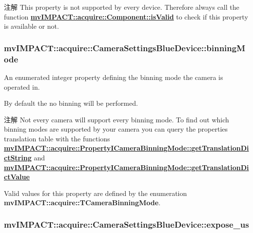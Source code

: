 \begin{DoxyNote}{注解}
This property is not supported by every device. Therefore always call the function {\bfseries \hyperlink{classmv_i_m_p_a_c_t_1_1acquire_1_1_component_ac51e55e7e046101f3c6119d84123abd5}{mv\+I\+M\+P\+A\+C\+T\+::acquire\+::\+Component\+::is\+Valid}} to check if this property is available or not. 
\end{DoxyNote}
\hypertarget{classmv_i_m_p_a_c_t_1_1acquire_1_1_camera_settings_blue_device_a6dc3cb5b21c3b9b6ebba4039a601b982}{
\subsubsection[{binning\+Mode}]{ mv\+I\+M\+P\+A\+C\+T\+::acquire\+::\+Camera\+Settings\+Blue\+Device\+::binning\+Mode}}\label{classmv_i_m_p_a_c_t_1_1acquire_1_1_camera_settings_blue_device_a6dc3cb5b21c3b9b6ebba4039a601b982}


An enumerated integer property defining the binning mode the camera is operated in. 

By default the no binning will be performed. \begin{DoxyNote}{注解}
Not every camera will support every binning mode. To find out which binning modes are supported by your camera you can query the properties translation table with the functions {\bfseries \hyperlink{classmv_i_m_p_a_c_t_1_1acquire_1_1_enum_property_i_af5ec5a9c3657af2917f4ead78ef067db}{mv\+I\+M\+P\+A\+C\+T\+::acquire\+::\+Property\+I\+Camera\+Binning\+Mode\+::get\+Translation\+Dict\+String}} and {\bfseries \hyperlink{classmv_i_m_p_a_c_t_1_1acquire_1_1_enum_property_i_a0c50700ebff2806621c63d03b624f200}{mv\+I\+M\+P\+A\+C\+T\+::acquire\+::\+Property\+I\+Camera\+Binning\+Mode\+::get\+Translation\+Dict\+Value}} 
\end{DoxyNote}
Valid values for this property are defined by the enumeration {\bfseries mv\+I\+M\+P\+A\+C\+T\+::acquire\+::\+T\+Camera\+Binning\+Mode}. \hypertarget{classmv_i_m_p_a_c_t_1_1acquire_1_1_camera_settings_blue_device_ab802a564f56c021c4730899f1d8c1cba}{
\subsubsection[{expose\+\_\+us}]{ mv\+I\+M\+P\+A\+C\+T\+::acquire\+::\+Camera\+Settings\+Blue\+Device\+::expose\+\_\+us}}\label{classmv_i_m_p_a_c_t_1_1acquire_1_1_camera_settings_blue_device_ab802a564f56c021c4730899f1d8c1cba}


